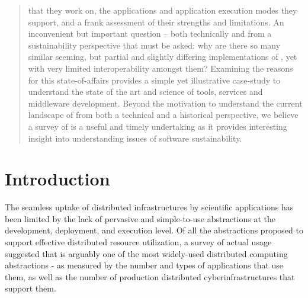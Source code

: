 \documentclass{sig-alternate}
\begin{document}
\begin{abstract}
  that they work on, the applications and application execution modes
  they support, and a frank assessment of their strengths and
  limitations.  An inconvenient but important question -- both
  technically and from a sustainability perspective that must be
  asked: why are there so many similar seeming, but partial and
  slightly differing implementations of \pilotjobs, yet with very
  limited interoperability amongst them?  Examining the reasons for
  this state-of-affairs provides a simple yet illustrative case-study
  to understand the state of the art and science of tools, services
  and middleware development.  Beyond the motivation to understand the
  current landscape of \pilotjobs from both a technical and a
  historical perspective, we believe a survey of \pilotjobs is a
  useful and timely undertaking as it provides interesting insight
  into understanding issues of software sustainability.
\end{abstract}

\section{Introduction}
\label{sec:intro}



The seamless uptake of distributed infrastructures by scientific applications
has been limited by the lack of pervasive and simple-to-use abstractions at the
development, deployment, and execution level. Of all the abstractions proposed
to support effective distributed resource utilization, a survey of actual usage
suggested that \pilotjob {} is arguably one of
the most widely-used distributed computing abstractions - as measured by the
number and types of applications that use them, as well as the number of
production distributed cyberinfrastructures that support them. 
\end{document}
